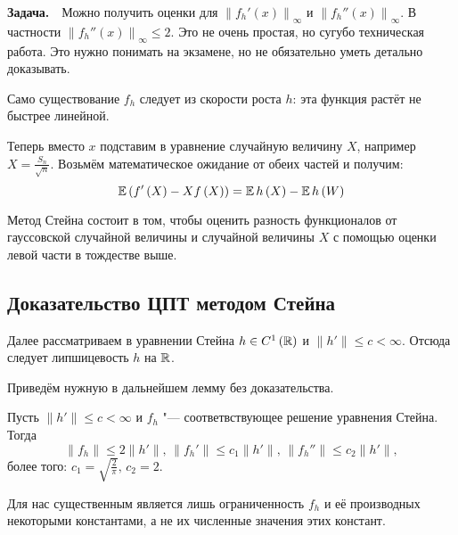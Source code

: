 \textbf{Задача.}~~Можно получить оценки для $\left\|f_h'(x)\right\|_{\infty}$ и $\left\|f_h''(x)\right\|_{\infty}$. В частности $\left\|f_h''(x)\right\|_{\infty} \leqslant 2$. Это не очень простая, но сугубо техническая работа. Это нужно понимать на экзамене, но не обязательно уметь детально доказывать.

Само существование $f_h$ следует из скорости роста $h$: эта функция растёт не быстрее линейной.

Теперь вместо $x$ подставим в уравнение случайную величину $X$, например $X = \frac{S_n}{\sqrt{n}}$.  Возьмём математическое ожидание от обеих частей и получим:
$$
\operatorname*{\mathbb{E}}\left(f'\left(X\right) - Xf\left(X\right)\right) = \operatorname*{\mathbb{E}} h\left(X\right) - \operatorname*{\mathbb{E}} h\left(W\right)
$$

Метод Стейна состоит в том, чтобы оценить разность функционалов от гауссовской случайной величины и случайной величины $X$ с помощью оценки левой части в тождестве выше.

\subsection{Доказательство ЦПТ методом Стейна}

Далее рассматриваем в уравнении Стейна $h \in C^1\left(\mathbb{R}\right)$ и $\|h'\| \leqslant c < \infty$. Отсюда следует липшицевость $h$ на $\mathbb{R}$.

Приведём нужную в дальнейшем лемму без доказательства.

\begin{lemma}\label{lect14:lemma1}
Пусть  $\|h'\| \leqslant c < \infty$ и $f_h$ "--- соответвствующее решение уравнения Стейна. Тогда 
$$
\|f_h\| \leqslant 2\|h'\|, \, \|f_h'\| \leqslant c_1\|h'\|, \, \|f_h''\| \leqslant c_2\|h'\|,
$$
более того: $c_1 = \sqrt{\frac{2}{\pi}}, \, c_2 = 2$.
\end{lemma}

Для нас существенным является лишь ограниченность $f_h$ и её производных некоторыми константами, а не их численные значения этих констант.

